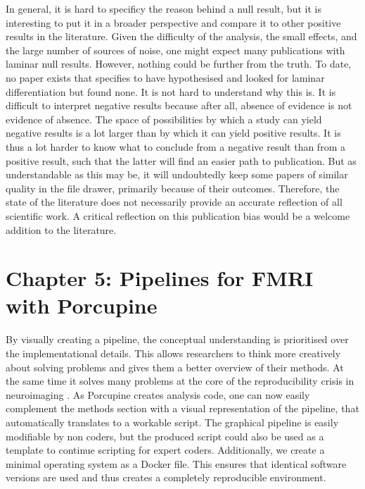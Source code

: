 In general, it is hard to specificy the reason behind a null result, but it is interesting to put it in a broader perspective and compare it to other positive results in the literature. Given the difficulty of the analysis, the small effects, and the large number of sources of noise, one might expect many publications with laminar null results. However, nothing could be further from the truth. To date, no paper exists that specifies to have hypothesised and looked for laminar differentiation but found none. %
It is not hard to understand why this is. It is difficult to interpret negative results because after all, absence of evidence is not evidence of absence. The space of possibilities by which a study can yield negative results is a lot larger than by which it can yield positive results. It is thus a lot harder to know what to conclude from a negative result than from a positive result, such that the latter will find an easier path to publication. But as understandable as this may be, it will undoubtedly keep some papers of similar quality in the file drawer, primarily because of their outcomes. Therefore, the state of the literature does not necessarily provide an accurate reflection of all scientific work. A critical reflection on this publication bias would be a welcome addition to the literature. 

\section*{Chapter 5: Pipelines for FMRI with Porcupine}
By visually creating a pipeline, the conceptual understanding is prioritised over the implementational details. This allows researchers to think more creatively about solving problems and gives them a better overview of their methods. At the same time it solves many problems at the core of the reproducibility crisis in neuroimaging \cite{Nature2017,...}. As Porcupine creates analysis code, one can now easily complement the methods section with a visual representation of the pipeline, that automatically translates to a workable script. The graphical pipeline is easily modifiable by non coders, but the produced script could also be used as a template to continue scripting for expert coders. Additionally, we create a minimal operating system as a Docker file. This ensures that identical software versions are used and thus creates a completely reproducible environment.

